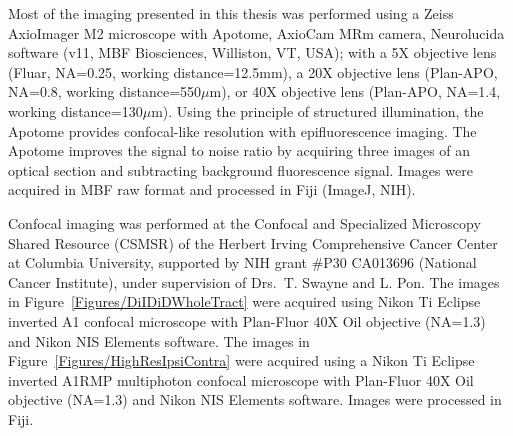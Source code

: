 Most of the imaging presented in this thesis was performed using a Zeiss AxioImager M2 microscope with Apotome, AxioCam MRm camera, Neurolucida software (v11, MBF Biosciences, Williston, VT, USA); with a 5X objective lens (Fluar, NA=0.25, working distance=12.5mm), a 20X objective lens (Plan-APO, NA=0.8, working distance=550$\mu$m), or 40X objective lens (Plan-APO, NA=1.4, working distance=130$\mu$m).
Using the principle of structured illumination, the Apotome provides confocal-like resolution with epifluorescence imaging.
The Apotome improves the signal to noise ratio by acquiring three images of an optical section and subtracting background fluorescence signal.
Images were acquired in MBF raw format and processed in Fiji (ImageJ, NIH).

Confocal imaging was performed at the Confocal and Specialized Microscopy Shared Resource (CSMSR) of the Herbert Irving Comprehensive Cancer Center at Columbia University, supported by NIH grant \#P30 CA013696 (National Cancer Institute), under supervision of Drs.~T. Swayne and L. Pon.
The images in Figure~\ref{Figures/DiIDiDWholeTract} were acquired using Nikon Ti Eclipse inverted A1 confocal microscope with Plan-Fluor 40X Oil objective (NA=1.3) and Nikon NIS Elements software.
The images in Figure~\ref{Figures/HighResIpsiContra} were acquired using a Nikon Ti Eclipse inverted A1RMP multiphoton confocal microscope with Plan-Fluor 40X Oil objective (NA=1.3) and Nikon NIS Elements software.
Images were processed in Fiji.
